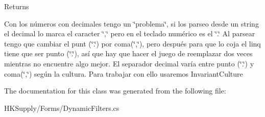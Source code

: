 \begin{DoxyReturn}{Returns}

\end{DoxyReturn}


Con los números con decimales tengo un \char`\"{}problema\char`\"{}, si los parseo desde un string el decimal lo marca el caracter \char`\"{},\char`\"{} pero en el teclado numérico es el \char`\"{}.\char`\"{} Al parsear tengo que cambiar el punt (\char`\"{}.\char`\"{}) por coma(\char`\"{},\char`\"{}), pero después para que lo coja el linq tiene que ser punto (\char`\"{}.\char`\"{}), así que hay que hacer el juego de reemplazar dos veces mientras no encuentre algo mejor. El separador decimal varía entre punto (\char`\"{}.\char`\"{}) y coma(\char`\"{},\char`\"{}) según la cultura. Para trabajar con ello usaremos Invariant\+Culture 

The documentation for this class was generated from the following file\+:\begin{DoxyCompactItemize}
\item 
H\+K\+Supply/\+Forms/Dynamic\+Filters.\+cs\end{DoxyCompactItemize}
